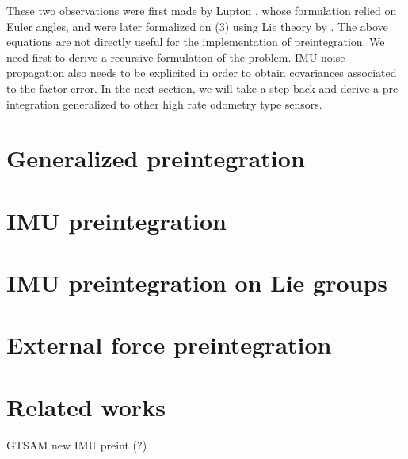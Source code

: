 These two observations were first made by Lupton \cite{lupton-09}, whose formulation relied on Euler angles, and were later formalized on \SO(3) using Lie theory
by \cite{forster2017-TRO}. The above equations are not directly useful for the implementation of preintegration. We need first to derive a recursive formulation 
of the problem. IMU noise propagation also needs to be explicited in order to obtain covariances associated to the factor error. In the next section, we will take 
a step back and derive a pre-integration generalized to other high rate odometry type sensors.

\section{Generalized preintegration}


\section{IMU preintegration}
\section{IMU preintegration on Lie groups}
\section{External force preintegration}


\section{Related works}

\cite{hartley2018legged}
\cite{wisth2020preintegrated}
\cite{lupton-09}
\cite{forster2017-TRO}
GTSAM new IMU preint (?)
\cite{eckenhoff2019closed}
\cite{brossard2021associating}
\cite{luo2021unified} 